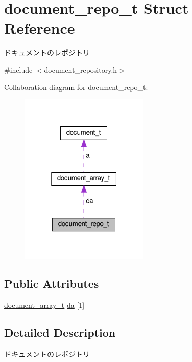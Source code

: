 \hypertarget{structdocument__repo__t}{}\section{document\+\_\+repo\+\_\+t Struct Reference}
\label{structdocument__repo__t}


ドキュメントのレポジトリ  




{\ttfamily \#include $<$document\+\_\+repository.\+h$>$}



Collaboration diagram for document\+\_\+repo\+\_\+t\+:\nopagebreak
\begin{figure}[H]
\begin{center}
\leavevmode
\includegraphics[width=175pt]{structdocument__repo__t__coll__graph}
\end{center}
\end{figure}
\subsection*{Public Attributes}
\begin{DoxyCompactItemize}
\item 
\hyperlink{structdocument__array__t}{document\+\_\+array\+\_\+t} \hyperlink{structdocument__repo__t_a9db2e8a3603bcf80f9500de054d5d995}{da} \mbox{[}1\mbox{]}
\end{DoxyCompactItemize}


\subsection{Detailed Description}
ドキュメントのレポジトリ 


